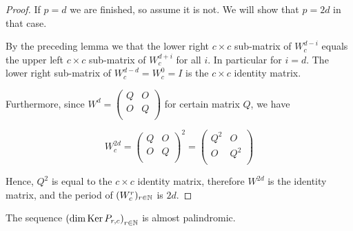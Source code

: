 \begin{proof}
  If $p=d$ we are finished, so assume it is not. We will show that $p=2d$ in
  that case.

  By the preceding lemma we that the lower right $c\times c$ sub-matrix of
  $W_{c}^{d-i}$ equals the upper left $c\times c$ sub-matrix of $W_{c}^{d+i}$
  for all $i$. In particular for $i=d$. The lower right sub-matrix of
  $W_{c}^{d-d} = W_{c}^{0} = I$ is the $c\times c$ identity matrix.

  Furthermore, since $W^{d}=\left(\begin{smallmatrix} Q & O \\ O & Q \\\end{smallmatrix}\right)$
  for certain matrix $Q$, we have

  \[
  W_{c}^{2d}
  =
  \left(
  \begin{array}{cc}
    Q & O \\
    O & Q \\
  \end{array}
  \right)^{2}
  =
  \left(
  \begin{array}{cc}
    Q^{2} & O \\
    O & Q^{2} \\
  \end{array}
  \right)
  \]

  Hence, $Q^{2}$ is equal to the $c\times c$ identity matrix, therefore $W^{2d}$
  is the identity matrix, and the period of $(W_{c}^{r})_{r\in\mathbb{N}}$ is $2d$.
\end{proof}

\begin{theorem}
  The sequence $\left(\dim\operatorname{Ker} P_{r,c}\right)_{r\in\mathbb{N}}$
  is almost palindromic.
\end{theorem}

